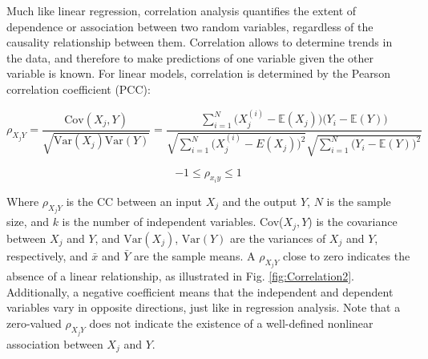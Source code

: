 \documentclass[12pt]{article}
\begin{document}
{Much like linear regression, correlation analysis quantifies the extent of dependence or association between two random variables, regardless of the causality relationship between them.  Correlation allows to determine  trends in the data, and therefore to make predictions of one variable given the other variable is known.
For linear models, correlation is determined by the Pearson correlation coefficient (PCC):


\begin{equation}
\rho_{X_{j}Y}=\frac{\text{Cov}(X_{j},Y)}{\sqrt{\text{Var}(X_{j})\text{Var}(Y)}}=\frac{\sum^{N}_{i=1}\big(X^{(i)}_{j}-\mathbb{E}(X_{j})\big)\big(Y_{i}-\mathbb{E}(Y)\big)}{\sqrt{\displaystyle\sum^{N}_{i=1}\big(X^{(i)}_{j}-E(X_{j})\big)^{2}}\sqrt{\displaystyle\sum^{N}_{i=1}\big(Y_{i}-\mathbb{E}(Y)\big)^{2}}}
\end{equation}


\[-1\leq \rho_{x_{i}y} \leq 1\]

\vspace{0.5cm}
Where $\rho_{X_{j}Y}$ is the CC between an input $X_{j}$ and the output $Y$, $N$ is the sample size, and $k$ is the number of independent variables. Cov($X_{j},Y$) is the covariance between $X_{j}$ and $Y$, and $\text{Var}(X_{j})$, $\text{Var}(Y)$ are the variances of $X_{j}$ and $Y$, respectively, and $\bar x$ and $\bar Y$ are the sample means. A $\rho_{X_{j}Y}$ close to zero indicates the absence of a linear relationship, as illustrated in Fig. \ref{fig:Correlation2}. Additionally, a negative coefficient means that the independent and dependent variables vary in opposite directions, just like in regression analysis. Note that a zero-valued $\rho_{X_{j}Y}$ does not indicate the existence of a well-defined nonlinear association between $X_{j}$ and $Y$.

}
\end{document}
